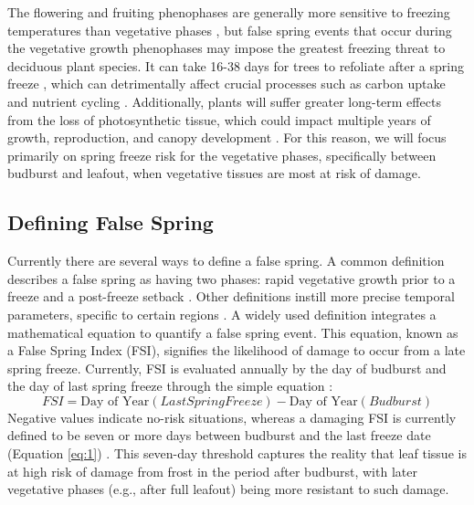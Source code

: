 \documentclass{article}\usepackage[]{graphicx}\usepackage[]{color}
\begin{document}
The flowering and fruiting phenophases are generally more sensitive to freezing temperatures than vegetative phases \citep{Inouye2000, Augspurger2009, Caradonna2016, Lenz2013}, but false spring events that occur during the vegetative growth phenophases may impose the greatest freezing threat to deciduous plant species. It can take 16-38 days for trees to refoliate after a spring freeze \citep{Gu2008, Augspurger2009, Augspurger2013, Menzel2015}, which can detrimentally affect crucial processes such as carbon uptake and nutrient cycling \citep{Hufkens2012, Richardson2013, Klosterman2018}. Additionally, plants will suffer greater long-term effects from the loss of photosynthetic tissue, which could impact multiple years of growth, reproduction, and canopy development \citep{Vitasse2014, Xie2015}.  For this reason, we will focus primarily on spring freeze risk for the vegetative phases, specifically between budburst and leafout, when vegetative tissues are most at risk of damage.

\subsection*{Defining False Spring}
Currently there are several ways to define a false spring. A common definition describes a false spring as having two phases: rapid vegetative growth prior to a freeze and a post-freeze setback \citep{Gu2008}. Other definitions instill more precise temporal parameters, specific to certain regions \citep[e.g., in][false spring for the Midwestern United States is defined as a warmer than average March, a freezing April, and enough growing degree days between budburst and the last freeze date]{Augspurger2013}. A widely used definition integrates a mathematical equation to quantify a false spring event. This equation, known as a False Spring Index (FSI), signifies the likelihood of damage to occur from a late spring freeze. Currently, FSI is evaluated annually by the day of budburst and the day of last spring freeze \citep[often calculated at -2.2$^{\circ}$C,][]{Schwartz1993} through the simple equation \citep{Marino2011}:
\begin{equation} \label{eq:1}
FSI = \text{Day of Year} (Last Spring Freeze) - \text{Day of Year} (Budburst)
\end{equation}
Negative values indicate no-risk situations, whereas a damaging FSI is currently defined to be seven or more days between budburst and the last freeze date (Equation \ref{eq:1}) \citep{Peterson2014}. This seven-day threshold captures the reality that leaf tissue is at high risk of damage from frost in the period after budburst, with later vegetative phases (e.g., after full leafout) being more resistant to such damage.%
\end{document}
